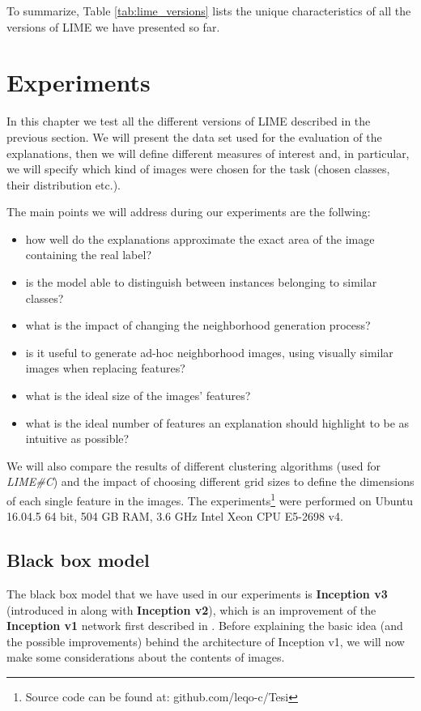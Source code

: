 \documentclass[12pt, twoside, a4paper]{report}
\begin{document}
To summarize, Table \ref{tab:lime_versions} lists the unique characteristics of all the versions of LIME we have presented so far.


\chapter{Experiments}\label{chapt:experiments}

In this chapter we test all the different versions of LIME described in the previous section. We will present the data set used for the evaluation of the explanations, then we will define different measures of interest and, in particular, we will specify which kind of images were chosen for the task (chosen classes, their distribution etc.). 

The main points we will address during our experiments are the follwing:

\begin{itemize}
\item how well do the explanations approximate the exact area of the image containing the real label?
\item is the model able to distinguish between instances belonging to similar classes?
\item what is the impact of changing the neighborhood generation process?
\item is it useful to generate ad-hoc neighborhood images, using visually similar images when replacing features?
\item what is the ideal size of the images' features?
\item what is the ideal number of features an explanation should highlight to be as intuitive as possible?
\end{itemize}

We will also compare the results of different clustering algorithms (used for \textit{LIME\#C}) and the impact of choosing different grid sizes to define the dimensions of each single feature in the images.
The experiments\footnote{Source code can be found at: github.com/leqo-c/Tesi} were performed on Ubuntu 16.04.5 64 bit, 504 GB RAM, 3.6 GHz Intel Xeon CPU E5-2698 v4.

\section{Black box model}

The black box model that we have used in our experiments is \textbf{Inception v3} (introduced in \cite{inception-v3} along with \textbf{Inception v2}), which is an improvement of the \textbf{Inception v1} network first described in \cite{inception-v1}. Before explaining the basic idea (and the possible improvements) behind the architecture of Inception v1, we will now make some considerations about the contents of images. 
\end{document}
